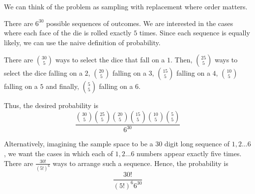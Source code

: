 We can think of the problem as sampling with replacement where order matters.

There are $6^{30}$ possible sequences of outcomes. We are interested in the cases 
where each face of the die is rolled exactly $5$ times. Since each sequence is 
equally likely, we can use the naive definition of probability.

There are $\binom{30}{5}$ ways to select the dice that fall on a $1$. Then, 
$\binom{25}{5}$ ways to select the dice falling on a $2$, $\binom{20}{5}$ 
falling on a $3$, $\binom{15}{5}$ falling on a $4$, $\binom{10}{5}$ falling 
on a $5$ and finally, $\binom{5}{5}$ falling on a $6$.

Thus, the desired probability is $$\frac{\binom{30}{5} \binom{25}{5} 
\binom{20}{5} \binom{15}{5} \binom{10}{5} \binom{5}{5}}{6^{30}}$$ 

Alternatively, imagining the sample space to be a $30$ digit long sequence
of $1, 2 \dots 6$, we want the cases in which each of $1, 2 \dots 6$ numbers
appear exactly five times. There are $\frac{30!}{(5!)^{6}}$ ways to arrange 
such a sequence. Hence, the probability is $$\frac{30!}{(5!)^{6} 6^{30}}$$
